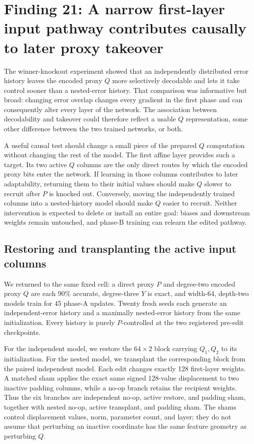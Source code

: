 
\section*{Finding 21: A narrow first-layer input pathway contributes causally to later proxy takeover}

The winner-knockout experiment showed that an independently distributed error history leaves the encoded proxy $Q$ more selectively decodable and lets it take control sooner than a nested-error history. That comparison was informative but broad: changing error overlap changes every gradient in the first phase and can consequently alter every layer of the network. The association between decodability and takeover could therefore reflect a usable $Q$ representation, some other difference between the two trained networks, or both.

A useful causal test should change a small piece of the prepared $Q$ computation without changing the rest of the model. The first affine layer provides such a target. Its two active $Q$ columns are the only direct routes by which the encoded proxy bits enter the network. If learning in those columns contributes to later adaptability, returning them to their initial values should make $Q$ slower to recruit after $P$ is knocked out. Conversely, moving the independently trained columns into a nested-history model should make $Q$ easier to recruit. Neither intervention is expected to delete or install an entire goal: biases and downstream weights remain untouched, and phase-B training can relearn the edited pathway.

\subsection*{Restoring and transplanting the active input columns}

We returned to the same fixed cell: a direct proxy $P$ and degree-two encoded proxy $Q$ are each 90\% accurate, degree-three $Y$ is exact, and width-64, depth-two models train for 45 phase-A updates. Twenty fresh seeds each generate an independent-error history and a maximally nested-error history from the same initialization. Every history is purely $P$-controlled at the two registered pre-edit checkpoints.

For the independent model, we restore the $64\times2$ block carrying $Q_1,Q_2$ to its initialization. For the nested model, we transplant the corresponding block from the paired independent model. Each edit changes exactly 128 first-layer weights. A matched sham applies the exact same signed 128-value displacement to two inactive padding columns, while a no-op branch retains the recipient weights. Thus the six branches are independent no-op, active restore, and padding sham, together with nested no-op, active transplant, and padding sham. The shams control displacement values, norm, parameter count, and layer; they do not assume that perturbing an inactive coordinate has the same feature geometry as perturbing $Q$.

